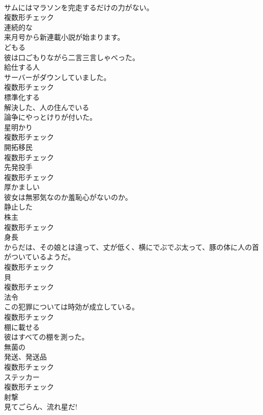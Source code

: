 \documentclass[8pt]{extreport}
\begin{document}
\begin{CJK}{UTF8}{min}
\\	サムにはマラソンを完走するだけの力がない。	
\\	複数形チェック
\\	[形容詞]	連続的な	
\\	来月号から新連載小説が始まります。	
\\	[動詞]	どもる	
\\	彼は口ごもりながら二言三言しゃべった。	
\\	[名詞]	給仕する人	
\\	サーバーがダウンしていました。	
\\	複数形チェック
\\	[動詞]	標準化する	
\\	[形容詞]	解決した、人の住んでいる	
\\	論争にやっとけりが付いた。	
\\	[名詞]	星明かり	
\\	複数形チェック
\\	[名詞]	開拓移⺠	
\\	複数形チェック
\\	[名詞]	先発投手	
\\	複数形チェック
\\	[形容詞]	厚かましい	
\\	彼女は無邪気なのか羞恥心がないのか。	
\\	[形容詞]	静止した	
\\	[名詞]	株主	
\\	複数形チェック
\\	[名詞]	身⻑	
\\	からだは、その娘とは違って、丈が低く、横にでぶでぶ太って、豚の体に人の首がついているようだ。	
\\	複数形チェック
\\	[名詞]	貝	
\\	複数形チェック
\\	[名詞]	法令	
\\	この犯罪については時効が成立している。	
\\	複数形チェック
\\	[動詞]	棚に載せる	
\\	彼はすべての棚を測った。	
\\	[形容詞]	無菌の	
\\	[名詞]	発送、発送品	
\\	複数形チェック
\\	[名詞]	ステッカー	
\\	複数形チェック
\\	[名詞]	射撃	
\\	見てごらん、流れ星だ!	

\end{CJK}
\end{document}
